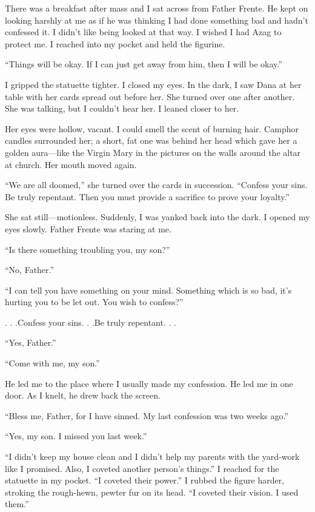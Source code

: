There was a breakfast after mass and I sat across from Father Frente. He
kept on looking harshly at me as if he was thinking I had done something
bad and hadn't confessed it. I didn't like being looked at that way. I
wished I had Azag to protect me. I reached into my pocket and held the
figurine.

``Things will be okay. If I can just get away from him, then I will be
okay.''

I gripped the statuette tighter. I closed my eyes. In the dark, I saw
Dana at her table with her cards spread out before her. She turned over
one after another. She was talking, but I couldn't hear her. I leaned
closer to her.

Her eyes were hollow, vacant. I could smell the scent of burning hair.
Camphor candles surrounded her; a short, fat one was behind her head
which gave her a golden aura---like the Virgin Mary in the pictures on
the walls around the altar at church. Her mouth moved again.

``We are all doomed,'' she turned over the cards in succession.
``Confess your sins. Be truly repentant. Then you must provide a
sacrifice to prove your loyalty.''

She sat still---motionless. Suddenly, I was yanked back into the dark. I
opened my eyes slowly. Father Frente was staring at me.

``Is there something troubling you, my son?''

``No, Father.''

``I can tell you have something on your mind. Something which is so bad,
it's hurting you to be let out. You wish to confess?''

. . .Confess your sins. . .Be truly repentant. . .

``Yes, Father.''

``Come with me, my son.''

He led me to the place where I usually made my confession. He led me in
one door. As I knelt, he drew back the screen.

``Bless me, Father, for I have sinned. My last confession was two weeks
ago.''

``Yes, my son. I missed you last week.''

``I didn't keep my house clean and I didn't help my parents with the
yard-work like I promised. Also, I coveted another person's things.'' I
reached for the statuette in my pocket. ``I coveted their power.'' I
rubbed the figure harder, stroking the rough-hewn, pewter fur on its
head. ``I coveted their vision. I used them.''

